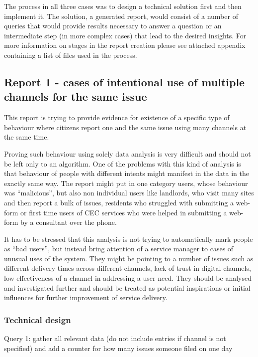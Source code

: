 The process in all three cases was to design a technical solution first and then implement it. The solution, a generated report, would consist of a number of queries that would provide results necessary to answer a question or an intermediate step (in more complex cases) that lead to the desired insights. For more information on stages in the report creation please see attached appendix containing a list of files used in the process.
	
		\subsection{Report 1 - cases of intentional use of multiple channels for the same issue}
		
This report is trying to provide evidence for existence of a specific type of behaviour where citizens report one and the same issue using many channels at the same time.

Proving such behaviour using solely data analysis is very difficult and should not be left only to an algorithm. One of the problems with this kind of analysis is that behaviour of people with different intents might manifest in the data in the exactly same way. The report might put in one category users, whose behaviour was “malicious”, but also non individual users like landlords, who visit many sites and then report a bulk of issues, residents who struggled with submitting a web-form or first time users of CEC services who were helped in submitting a web-form by a consultant over the phone.

It has to be stressed that this analysis is not trying to automatically mark people as “bad users”, but instead bring attention of a service manager to cases of unusual uses of the system. They might be pointing to a number of issues such as different delivery times across different channels, lack of trust in digital channels, low effectiveness of a channel in addressing a user need. They should be analysed and investigated further and should be treated as potential inspirations or initial influences for further improvement of service delivery.

			\subsubsection{Technical design}
			
Query 1: gather all relevant data (do not include entries if channel is not specified) and add a counter for how many issues someone filed on one day

